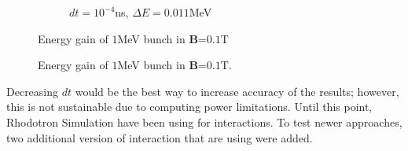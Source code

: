 \documentclass[a4paper,oneside,12pt]{report}
\numberwithin{equation}{chapter}
\begin{document}
{\begin{figure}
\begin{subfigure}{0.8\textwidth}
        \caption*{$dt=10^{-4}$ns, $\Delta E=0.011$MeV}
    \end{subfigure}
    \caption{Energy gain of $1$MeV bunch in \textbf{B}=$0.1$T}
    \label{fig:mag_lf_render}
\end{figure} \fi
\begin{figure}
    \centering
    \vspace{15pt}
    \vspace{15pt}
    \caption{Energy gain of $1$MeV bunch in \textbf{B}=$0.1$T.}
    \label{fig:mag_lf_render}
\end{figure}
Decreasing $dt$ would be the best way to increase accuracy of the results; however, this is not sustainable due to computing power limitations. 
Until this point, Rhodotron Simulation have been using  for \eEM interactions. 
To test newer approaches, two additional version of  \eEM interaction that are using  were added.
}
\end{document}
